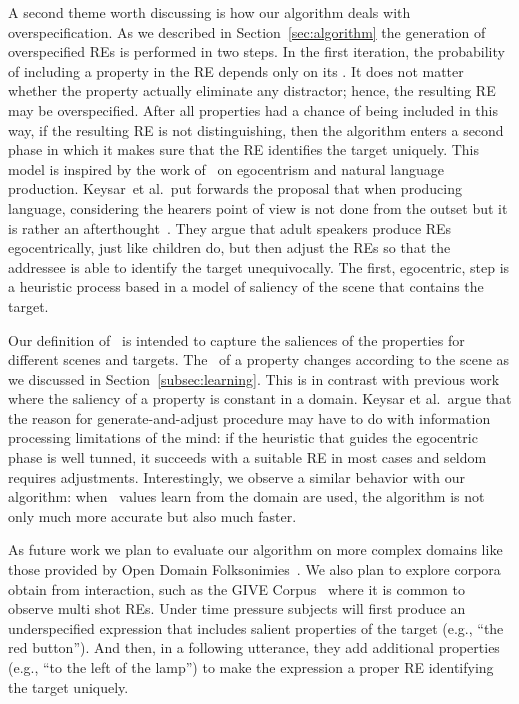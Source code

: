 A second theme worth discussing is how our algorithm deals with overspecification. As we described in Section~\ref{sec:algorithm} the generation of overspecified REs is performed in two steps. In the first iteration, the probability of including a property in the RE depends only on its \puse. It does not matter whether the property actually eliminate any distractor; hence, the resulting RE may be overspecified. After all properties had a chance of being included in this way, if the resulting RE is not distinguishing, then the algorithm enters a second phase in which it makes sure that the RE identifies the target uniquely.  This model is inspired by the work of~\cite{keysar:Curr98} on egocentrism and natural language production. Keysar~et al.\ put forwards the proposal that when producing language, considering the hearers point of view is not done from the outset but it is rather an afterthought~\cite{keysar:Curr98}. They argue that adult speakers produce REs egocentrically, just like children do, but then adjust the REs so that the addressee is able to identify the target unequivocally. The first, egocentric, step is a heuristic process based in a model of saliency of the scene that contains the target. 

Our definition of \puse\ is intended to capture the saliences of the properties for different scenes and targets. The \puse\ of a property changes according to the scene as we discussed in Section~\ref{subsec:learning}. This is in contrast with previous work where the saliency of a property is constant in a domain. Keysar et al.~argue that the reason for generate-and-adjust procedure may have to do with information processing limitations of the mind: if the heuristic that guides the egocentric phase is well tunned, it succeeds with a suitable RE in most cases and seldom requires adjustments. Interestingly, we observe a similar behavior with our algorithm: when \puse\ values learn from the domain are used, the algorithm is not only much more accurate but also much faster. 

As future work we plan to evaluate our algorithm on more complex domains like those provided by Open Domain Folksonimies~\cite{pacheco-duboue-dominguez:2012:NAACL-HLT}. We also plan to explore corpora obtain from interaction, such as the GIVE Corpus~\cite{GarGarKolStr10} where it is common to observe multi shot REs. Under time pressure subjects will first produce an underspecified expression that includes salient properties of the target (e.g., ``the red button'').  And then, in a following utterance, they add additional properties (e.g., ``to the left of the lamp'') to make the expression a proper RE  identifying the target uniquely.

